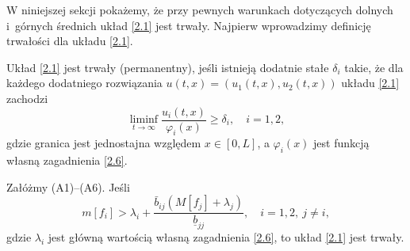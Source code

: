 	W niniejszej sekcji pokażemy, że przy pewnych warunkach dotyczących dolnych i~górnych średnich układ \eqref{2.1} jest trwały.
	Najpierw wprowadzimy definicję trwałości dla układu \eqref{2.1}.
	\begin{definition}
		Układ \eqref{2.1} jest trwały (permanentny), jeśli istnieją dodatnie stałe $\delta_i$ takie, że dla każdego dodatniego rozwiązania
		$u(t,x) = (u_1(t,x),u_2(t,x))$ układu \eqref{2.1} zachodzi
		\begin{equation}
			\liminf_{t \to \infty} \frac{u_i(t,x)}{\varphi_i(x)} \geq \delta_i, \quad i=1,2,
		\end{equation}
		gdzie granica jest jednostajna względem $x \in [0,L]$, a $\varphi_i(x)$ jest funkcją własną zagadnienia \eqref{2.6}.
	\end{definition}
	\begin{theorem}
		Załóżmy (A1)–(A6). Jeśli
		\begin{equation}
			\label{3.1}
			m[f_i] > \lambda_i + \frac{\bar{b}_{ij}(M[f_j] + \lambda_j)}{\underline{b}_{jj}}, \quad i=1,2,\ j\neq i,
		\end{equation}
		gdzie $\lambda_i$ jest główną wartością własną zagadnienia \eqref{2.6},  
		to układ \eqref{2.1} jest trwały.
	\end{theorem}
	
